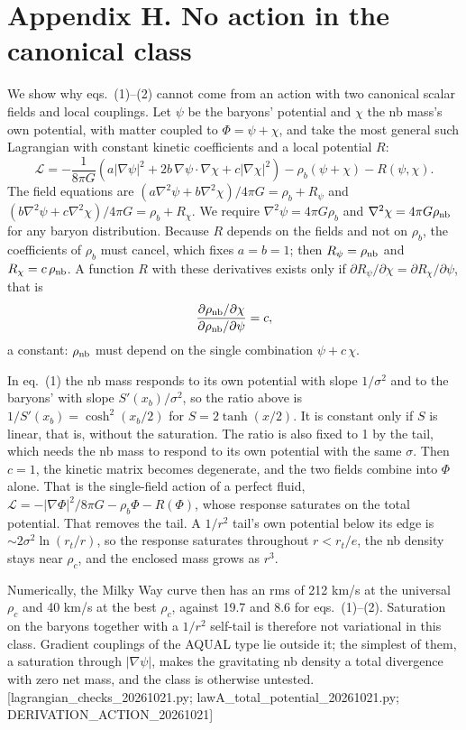 \documentclass[
  10pt,
]{article}
\begin{document}
\section{Appendix H. No action in the canonical class}\label{appendix-h}

We show why eqs.~(1)--(2) cannot come from an action with two canonical scalar fields and local couplings. Let $\psi$ be the baryons' potential and $\chi$ the nb mass's own potential, with matter coupled to $\Phi=\psi+\chi$, and take the most general such Lagrangian with constant kinetic coefficients and a local potential $R$:
\[
\mathcal{L}=-\frac{1}{8\pi G}\left(a|\nabla\psi|^2+2b\,\nabla\psi\cdot\nabla\chi+c|\nabla\chi|^2\right)-\rho_b(\psi+\chi)-R(\psi,\chi).
\]
The field equations are $(a\nabla^2\psi+b\nabla^2\chi)/4\pi G=\rho_b+R_\psi$ and $(b\nabla^2\psi+c\nabla^2\chi)/4\pi G=\rho_b+R_\chi$. We require $\nabla^2\psi=4\pi G\rho_b$ and $\nabla^2\chi=4\pi G\rho_{\rm nb}$ for any baryon distribution. Because $R$ depends on the fields and not on $\rho_b$, the coefficients of $\rho_b$ must cancel, which fixes $a=b=1$; then $R_\psi=\rho_{\rm nb}$ and $R_\chi=c\,\rho_{\rm nb}$. A function $R$ with these derivatives exists only if $\partial R_\psi/\partial\chi=\partial R_\chi/\partial\psi$, that is
\[
\frac{\partial\rho_{\rm nb}/\partial\chi}{\partial\rho_{\rm nb}/\partial\psi}=c,
\]
a constant: $\rho_{\rm nb}$ must depend on the single combination $\psi+c\,\chi$.

In eq.~(1) the nb mass responds to its own potential with slope $1/\sigma^2$ and to the baryons' with slope $S'(x_b)/\sigma^2$, so the ratio above is $1/S'(x_b)=\cosh^2(x_b/2)$ for $S=2\tanh(x/2)$. It is constant only if $S$ is linear, that is, without the saturation. The ratio is also fixed to 1 by the tail, which needs the nb mass to respond to its own potential with the same $\sigma$. Then $c=1$, the kinetic matrix becomes degenerate, and the two fields combine into $\Phi$ alone. That is the single-field action of a perfect fluid, $\mathcal{L}=-|\nabla\Phi|^2/8\pi G-\rho_b\Phi-R(\Phi)$, whose response saturates on the total potential. That removes the tail. A $1/r^2$ tail's own potential below its edge is $\sim2\sigma^2\ln(r_t/r)$, so the response saturates throughout $r<r_t/e$, the nb density stays near $\rho_c$, and the enclosed mass grows as $r^3$.

Numerically, the Milky Way curve then has an rms of 212 km/s at the universal $\rho_c$ and 40 km/s at the best $\rho_c$, against 19.7 and 8.6 for eqs.~(1)--(2). Saturation on the baryons together with a $1/r^2$ self-tail is therefore not variational in this class. Gradient couplings of the AQUAL type lie outside it; the simplest of them, a saturation through $|\nabla\psi|$, makes the gravitating nb density a total divergence with zero net mass, and the class is otherwise untested. {[}lagrangian\_checks\_20261021.py; lawA\_total\_potential\_20261021.py; DERIVATION\_ACTION\_20261021{]}
\end{document}
